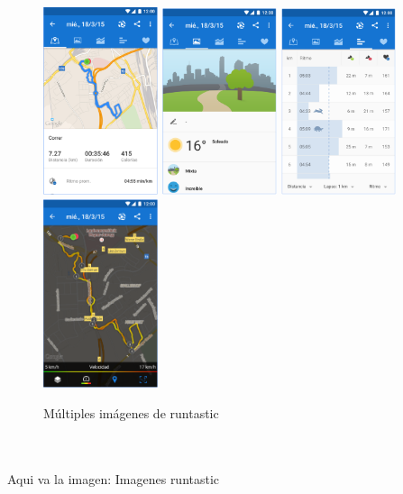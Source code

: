 \documentclass[a4paper, 11pt]{article}
\begin{document}
\begin{figure}[H]
                  \includegraphics[width=0.3\textwidth]{runtastic4}
                  \includegraphics[width=0.3\textwidth]{runtastic5}
                  \includegraphics[width=0.3\textwidth]{runtastic6}
                  \includegraphics[width=0.3\textwidth]{runtastic7}
                  \caption{Múltiples imágenes de runtastic}
                  \label{f:runtastic}
              \end{figure}
              \\\\\textcolor[rgb]{1,0,0}{Aqui va la imagen: Imagenes runtastic}\\\\
\end{document}
